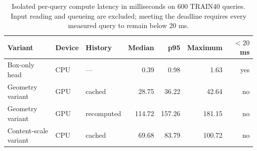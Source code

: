 \begin{table}[htbp]
\centering\small
\begin{tabular}{lllrrrr}
\toprule
Variant & Device & History & Median & p95 & Maximum & $<20$ ms \\
\midrule
Box-only head & CPU & --- & 0.39 & 0.98 & 1.63 & yes \\
Geometry variant & GPU & cached & 28.75 & 36.22 & 42.64 & no \\
Geometry variant & GPU & recomputed & 114.72 & 157.26 & 181.15 & no \\
Content-scale variant & CPU & cached & 69.68 & 83.79 & 100.72 & no \\
\bottomrule
\end{tabular}
\caption{Isolated per-query compute latency in milliseconds on 600 TRAIN40 queries. Input reading and queueing are excluded; meeting the deadline requires every measured query to remain below 20 ms.}
\label{tab:followup-latency}
\end{table}
